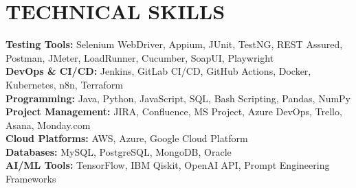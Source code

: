 \documentclass[11pt,a4paper]{article}
\begin{document}
\section*{TECHNICAL SKILLS}
\textbf{Testing Tools:} Selenium WebDriver, Appium, JUnit, TestNG, REST Assured, Postman, JMeter, LoadRunner, Cucumber, SoapUI, Playwright\\
\textbf{DevOps \& CI/CD:} Jenkins, GitLab CI/CD, GitHub Actions, Docker, Kubernetes, n8n, Terraform\\
\textbf{Programming:} Java, Python, JavaScript, SQL, Bash Scripting, Pandas, NumPy\\
\textbf{Project Management:} JIRA, Confluence, MS Project, Azure DevOps, Trello, Asana, Monday.com\\
\textbf{Cloud Platforms:} AWS, Azure, Google Cloud Platform\\
\textbf{Databases:} MySQL, PostgreSQL, MongoDB, Oracle\\
\textbf{AI/ML Tools:} TensorFlow, IBM Qiskit, OpenAI API, Prompt Engineering Frameworks
\end{document}
